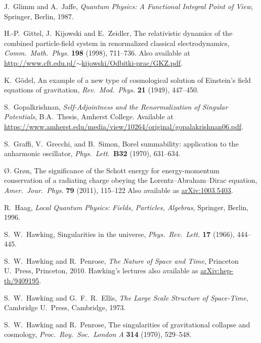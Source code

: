 \documentclass{article}
\begin{document}
\begin{thebibliography}{10}
 J.\ Glimm and A.\ Jaffe, \textsl{Quantum Physics: A Functional Integral Point of View}, Springer, Berlin, 1987. 

 H.-P.\ Gittel, J.\ Kijowski and E.\ Zeidler, The relativistic 
dynamics of the combined particle-field system in renormalized classical 
electrodynamics, \textsl{Comm.\ Math.\ Phys.} \textbf{198} (1998), 711--736.
Also available at \href{http://www.cft.edu.pl/~kijowski/Odbitki-prac/GKZ.pdf}{http://www.cft.edu.pl/$\sim$kijowski/Odbitki-prac/GKZ.pdf}.

 K.\ G\"odel, An example of a new type of cosmological solution of Einstein's field equations of gravitation, \textsl{Rev.\ Mod.\ Phys.} \textbf{21} (1949), 447--450. 

 S.\ Gopalkrishnan, \textsl{Self-Adjointness and the Renormalization of Singular Potentials}, B.A.\ Thesis, Amherst College.  Available at \href{https://www.amherst.edu/media/view/10264/original/gopalakrishnan06.pdf}{https://www.amherst.edu/media/view/10264/original/gopalakrishnan06.pdf}.

 S.\ Graffi, V.\ Grecchi, and B.\ Simon, Borel summability: application to the anharmonic oscillator, \textsl{Phys.\ Lett.\ }\textbf{B32} (1970), 631--634.

 \O. Gr\o n, The significance of the Schott energy for energy-momentum conservation of a radiating charge obeying the Lorentz--Abraham--Dirac equation, \textsl{Amer.\ Jour.\ Phys.} \textbf{79} (2011), 115--122  Also available as \href{http://arxiv.org/abs/1003.5403}{arXiv:1003.5403}.

 R.\ Haag, \textsl{Local Quantum Physics: Fields, Particles, Algebras}, Springer, Berlin, 1996.

 S.\ W.\ Hawking, Singularities in the universe, \textsl{Phys.\ Rev.\ Lett.} \textbf{17} (1966), 444--445.

 S.\ W.\ Hawking and R.\ Penrose, \textsl{The Nature
of Space and Time}, Princeton U.\ Press, Princeton, 2010.   Hawking's lectures also available as \href{http://arxiv.org/abs/hep-th/9409195}{arXiv:hep-th/9409195}.

 S.\ W.\ Hawking and G.\ F.\ R.\ Ellis, \textsl{The Large Scale Structure of Space-Time}, Cambridge U.\ Press, Cambridge, 1973.

 S.\ W.\ Hawking and R.\ Penrose, The singularities of gravitational collapse and cosmology, \textsl{Proc.\ Roy.\ Soc.\ London A} \textbf{314} (1970), 529--548.


\end{thebibliography}
\end{document}
